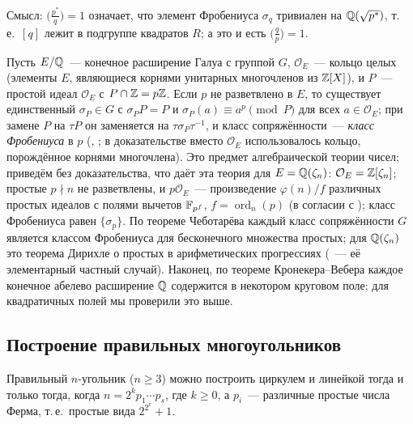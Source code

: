 Смысл: $\bigl(\frac{p^*}q\bigr)=1$ означает, что элемент Фробениуса $\sigma_q$ тривиален на $\mathbb Q(\sqrt{p^*})$, т.\,е.\ $[q]$
лежит в подгруппе квадратов $R$; а это и есть $\bigl(\frac qp\bigr)=1$.

\begin{aside}
Пусть $E/\mathbb Q$~--- конечное расширение Галуа с группой $G$, $\mathcal O_E$~--- кольцо целых (элементы $E$, являющиеся корнями
унитарных многочленов из $\mathbb Z[X]$), и $P$~--- простой идеал $\mathcal O_E$ с $P\cap\mathbb Z=p\mathbb Z$. Если $p$ не разветвлено в $E$, то
существует единственный $\sigma_P\in G$ с $\sigma_PP=P$ и $\sigma_P(a)\equiv a^p\pmod P$ для всех $a\in\mathcal O_E$; при
замене $P$ на $\tau P$ он заменяется на $\tau\sigma_P\tau^{-1}$, и класс сопряжённости~--- \emph{класс Фробениуса} в $p$ (, ;
в доказательстве  вместо $\mathcal O_E$ использовалось кольцо, порождённое корнями многочлена). Это предмет
алгебраической теории чисел; приведём без доказательства, что даёт эта теория для $E=\mathbb Q(\zeta_n)$:
$\mathcal O_E=\mathbb Z[\zeta_n]$; простые $p\nmid n$ не разветвлены, и $p\mathcal O_E$~--- произведение $\varphi(n)/f$ различных
простых идеалов с полями вычетов $\mathbb F_{p^f}$, $f=\operatorname{ord}_n(p)$ (в согласии с ); класс Фробениуса равен
$\{\sigma_p\}$. По теореме Чеботарёва каждый класс сопряжённости $G$ является классом Фробениуса для бесконечного
множества простых; для $\mathbb Q(\zeta_n)$ это теорема Дирихле о простых в арифметических прогрессиях (~--- её
элементарный частный случай). Наконец, по теореме Кронекера--Вебера каждое конечное абелево расширение $\mathbb Q$ содержится в
некотором круговом поле; для квадратичных полей мы проверили это выше.
\end{aside}

\subsection*{Построение правильных многоугольников}

\begin{theorem}[5.12: Гаусс]
Правильный $n$-угольник ($n\ge3$) можно построить циркулем и линейкой тогда и только тогда, когда
$n=2^kp_1\cdots p_s$, где $k\ge0$, а $p_i$~--- различные простые числа Ферма, т.\,е.\ простые вида $2^{2^r}+1$.
\end{theorem}

